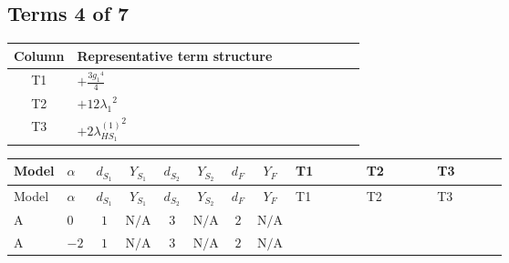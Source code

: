 \documentclass[8pt]{article}
\begin{document}
\begin{landscape}
\subsection*{Terms 4 of 7}
\begin{center}
\begin{tabular}{@{}c >{\raggedright\arraybackslash}p{0.82\linewidth}@{}}
\toprule
Column & Representative term structure \\
\midrule
T1 & \(\displaystyle +\frac{3 {g_1}^4}{4}\) \\
\midrule
T2 & \(\displaystyle +12 {\lambda_1}^2\) \\
\midrule
T3 & \(\displaystyle +2 {\lambda_{HS_1}^{(1)}}^2\) \\
\midrule
\bottomrule
\end{tabular}
\end{center}
\smallskip
\tiny
\begin{longtable}{@{}llcccccc >{\raggedright\arraybackslash}p{0.21\linewidth} >{\raggedright\arraybackslash}p{0.21\linewidth} >{\raggedright\arraybackslash}p{0.21\linewidth}@{}}
\toprule
Model & $\alpha$ & $d_{S_1}$ & $Y_{S_1}$ & $d_{S_2}$ & $Y_{S_2}$ & $d_F$ & $Y_F$ & T1 & T2 & T3 \\
\midrule
\endfirsthead
\toprule
Model & $\alpha$ & $d_{S_1}$ & $Y_{S_1}$ & $d_{S_2}$ & $Y_{S_2}$ & $d_F$ & $Y_F$ & T1 & T2 & T3 \\
\midrule
\endhead
A & $0$ & $1$ & $\text{N/A}$ & $3$ & $\text{N/A}$ & $2$ & $\text{N/A}$ & \scriptsize\adjustbox{max width=\linewidth}{$\begin{gathered} +\frac{3 {g_1}^4}{4}\end{gathered}$} & \scriptsize\adjustbox{max width=\linewidth}{$\begin{gathered} +12 {\lambda_1}^2\end{gathered}$} & \scriptsize\adjustbox{max width=\linewidth}{$\begin{gathered} +2 {\lambda_{HS_1}^{(1)}}^2\end{gathered}$} \\
\midrule
A & $-2$ & $1$ & $\text{N/A}$ & $3$ & $\text{N/A}$ & $2$ & $\text{N/A}$ & \scriptsize\adjustbox{max width=\linewidth}{$\begin{gathered} +\frac{3 {g_1}^4}{4}\end{gathered}$} & \scriptsize\adjustbox{max width=\linewidth}{$\begin{gathered} +12 {\lambda_1}^2\end{gathered}$} & \scriptsize\adjustbox{max width=\linewidth}{$\begin{gathered} +2 {\lambda_{HS_1}^{(1)}}^2\end{gathered}$} \\

\end{longtable}
\end{landscape}
\end{document}
